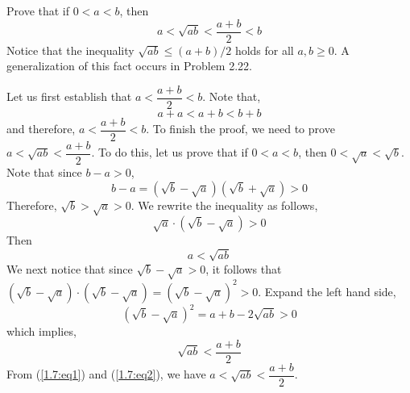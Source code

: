 \begin{pr} \label{1.7}
  Prove that if $0<a<b$, then
  \begin{equation*}
    a<\sqrt{ab}<\frac{a+b}{2}<b
  \end{equation*}
  Notice that the inequality $\sqrt{ab}\leq(a+b)/2$ holds
  for all $a,b\geq0$. A generalization of this fact
  occurs in Problem 2.22. %
\end{pr}
\begin{solution}
  Let us first establish that $a<\dfrac{a+b}{2}<b$. Note
  that,
  \begin{equation*}
    a+a<a+b<b+b
  \end{equation*}
  and therefore, $a<\dfrac{a+b}{2}<b$. To finish the proof,
  we need to prove ${a<\sqrt{ab}<\dfrac{a+b}{2}}$. To do this,
  let us prove that if $0<a<b$, then ${0<\sqrt{a}<\sqrt{b}}$.
  Note that since $b-a>0$,
  \begin{equation*}
    b-a=(\sqrt{b}-\sqrt{a})(\sqrt{b}+\sqrt{a})>0
  \end{equation*}
  Therefore, $\sqrt{b}>\sqrt{a}>0$. We rewrite the inequality
  as follows,
  \begin{equation*}
    \sqrt{a}\cdot(\sqrt{b}-\sqrt{a})>0
  \end{equation*}
  Then
  \begin{equation}
    a<\sqrt{ab} \label{1.7:eq1}
  \end{equation}
  We next notice that since ${\sqrt{b}-\sqrt{a}>0}$, it follows
  that \\$(\sqrt{b}-\sqrt{a})\cdot(\sqrt{b}-\sqrt{a})
  =(\sqrt{b}-\sqrt{a})^2>0$. Expand the left hand side,
  \begin{equation*}
    (\sqrt{b}-\sqrt{a})^2=a+b-2\sqrt{ab}>0
  \end{equation*}
  which implies,
  \begin{equation}
    \sqrt{ab}<\frac{a+b}{2} \label{1.7:eq2}
  \end{equation}
  From (\ref{1.7:eq1}) and (\ref{1.7:eq2}), we have
  $a<\sqrt{ab}<\dfrac{a+b}{2}$.
\end{solution}

